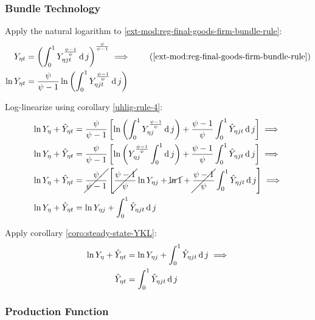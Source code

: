 \documentclass[../thesis.tex]{subfiles}
\begin{document}
\subsubsection*{Bundle Technology}

Apply the natural logarithm to \ref{ext-mod:reg-final-goods-firm-bundle-rule}:
\begin{align}
	Y_{\eta t} &= \left( \int_{0}^{1} Y_{\eta jt}^{\frac{\psi-1}{\psi}} \dif j \right)^{\frac{\psi}{\psi-1}} \implies  \tag{\ref{ext-mod:reg-final-goods-firm-bundle-rule}} \\
	\ln{Y_{\eta t}} &= {\frac{\psi}{\psi-1}} \ln{\left( \int_{0}^{1} Y_{\eta jt}^{\frac{\psi-1}{\psi}} \dif j \right)} \nonumber
\end{align}

Log-linearize using corollary \ref{uhlig-rule-4}:
\begin{align}
	\ln{Y_{\eta}} + \hat{Y}_{\eta t} &= \frac{\psi}{\psi-1} \left[ \ln \left( \int_{0}^{1} Y_{\eta j}^{\frac{\psi-1}{\psi}} \operatorname{d} j \right) + \frac{\psi-1}{\psi} \int_{0}^{1} \hat{Y}_{\eta jt} \operatorname{d} j \right] \implies \nonumber
	\\
	\ln{Y_{\eta}} + \hat{Y}_{\eta t} &= \frac{\psi}{\psi-1} \left[ \ln \left( Y_{\eta j}^{\frac{\psi-1}{\psi}} \int_{0}^{1} \operatorname{d} j \right) + \frac{\psi-1}{\psi} \int_{0}^{1} \hat{Y}_{\eta jt} \operatorname{d} j \right] \implies \nonumber
	\\
	\ln{Y_{\eta}} + \hat{Y}_{\eta t} &= \cancel{\frac{\psi}{\psi-1}} \left[ \cancel{\frac{\psi-1}{\psi}} \ln{Y_{\eta j}} + \cancel{\ln1} + \cancel{\frac{\psi-1}{\psi}} \int_{0}^{1} \hat{Y}_{\eta jt} \operatorname{d} j \right] \implies \nonumber
	\\
	\ln{Y_{\eta}} + \hat{Y}_{\eta t} &= \ln{Y_{\eta j}} + \int_{0}^{1} \hat{Y}_{\eta jt} \operatorname{d} j \nonumber
\end{align}

Apply corollary \ref{coro:steady-state-YKL}:
\begin{align}
	\ln{Y_{\eta}} + \hat{Y}_{\eta t} &= \ln{Y_{\eta j}} + \int_{0}^{1} \hat{Y}_{\eta jt} \operatorname{d} j \implies \nonumber \\
	\hat{Y}_{\eta t} &= \int_{0}^{1} \hat{Y}_{\eta jt} \operatorname{d} j 
	\label{ext-mod:reg-ll-final-goods-firm-bundle-rule}
\end{align}


\subsubsection*{Production Function}
\end{document}
